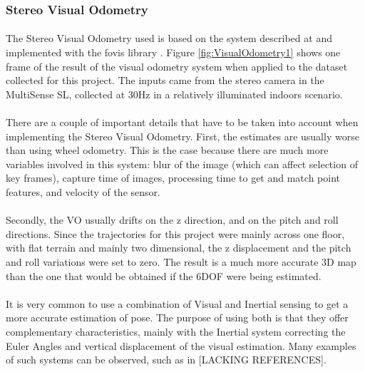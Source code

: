 \documentclass[11pt]{article}
\begin{document}
	\subsubsection*{Stereo Visual Odometry}
	\paragraph{}
	The Stereo Visual Odometry used is based on the system described at \cite{VisualOdometry} and implemented with the fovis library \cite{fovis}. Figure \ref{fig:VisualOdometry1} shows one frame of the result of the visual odometry system when applied to the dataset collected for this project. The inputs came from the stereo camera in the MultiSense SL, collected at 30Hz in a relatively illuminated indoors scenario.
	
	\paragraph{}
	There are a couple of important details that have to be taken into account when implementing the Stereo Visual Odometry. First, the estimates are usually worse than using wheel odometry. This is the case because there are much more variables involved in this system: blur of the image (which can affect selection of key frames), capture time of images, processing time to get and match point features, and velocity of the sensor. 
	
	\paragraph{}
	Secondly, the VO usually drifts on the z direction, and on the pitch and roll directions. Since the trajectories for this project were mainly across one floor, with flat terrain and mainly two dimensional, the z displacement and the pitch and roll variations were set to zero. The result is a much more accurate 3D map than the one that would be obtained if the 6DOF were being estimated.
	
	\paragraph{}
	It is very common to use a combination of Visual and Inertial sensing to get a more accurate estimation of pose. The purpose of using both is that they offer complementary characteristics, mainly with the Inertial system correcting the Euler Angles and vertical displacement of the visual estimation. Many examples of such systems can be observed, such as in [LACKING REFERENCES].
	
\end{document}

